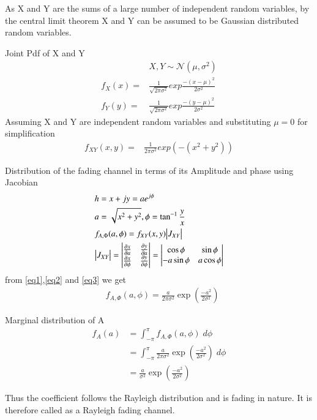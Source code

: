 \documentclass{beamer}
\begin{document}
\begin{frame}{}
 As X and Y are the sums of a large number
of independent random variables, by the central limit theorem X and Y can be
assumed to be Gaussian distributed random variables.
\begin{block}{Joint Pdf of X and Y}
\begin{align}
&X,Y\sim \mathcal{N}(\mu ,\sigma^2)\\
f_X(x)=&\frac{1}{\sqrt{2\pi \sigma^2}}exp{\frac{-(x-\mu)^2}{2\sigma^2}}\\
f_Y(y)=&\frac{1}{\sqrt{2\pi \sigma^2}}exp{\frac{-(y-\mu)^2}{2\sigma^2}}
\end{align}
Assuming X and Y are independent random variables and substituting $\mu=0$ for simplification 
\begin{align}
f_{XY}(x,y)=&\frac{1}{{2\pi \sigma^2 }}exp{\left(-(x^2+y^2)\right)}  \label{eq1} 
\end{align}
\end{block}
\end{frame}
\begin{frame}{}

\begin{block}{ Distribution of the fading channel in terms of its Amplitude and phase using Jacobian }
\begin{align}
&h=x+jy=ae^{j\phi}\\
&a=\sqrt{x^2+y^2}, \phi=\tan^{-1}{\frac{y}{x}}\label{eq2}\\
&f_{A,{\Phi}}(a,\phi)=f_{XY}(x,y)\big{|}J_{XY}\big{|}\\
&\big{|}J_{XY}\big{|} =
\begin{vmatrix}
\frac{\partial x}{\partial a} & \frac{\partial y}{\partial a} \\
\frac{\partial x}{\partial \phi} & \frac{\partial y}{\partial \phi} 
\end{vmatrix}=\begin{vmatrix}
\cos{\phi} & \sin{\phi} \\
-a\sin{\phi} & a\cos{\phi} 
\end{vmatrix}\label{eq3}
\end{align}
from \eqref{eq1},\eqref{eq2} and \eqref{eq3} we get
\begin{align}
  &f_{A,{\Phi}}(a,\phi)= \frac{a}{{2\pi \sigma^2}}\exp{\left(\frac{-a^2}{2\sigma^2}\right)} 
\end{align}
\end{block}
\end{frame}
\begin{frame}{}
 \begin{block}{Marginal distribution of A}
 \begin{align}
   f_A(a)&=\int_{-\pi}^{\pi}f_{A,{\Phi}}(a,\phi)\;d\phi\\
   &= \int_{-\pi}^{\pi}\frac{a}{{2\pi \sigma^2}}\exp{\left(\frac{-a^2}{2\sigma^2}\right)}\;d\phi\\
   &=\frac{a}{\sigma^2}\exp{\left(\frac{-a^2}{2\sigma^2}\right)}
 \end{align}
 \end{block}
 Thus the coefficient follows the Rayleigh distribution and is fading in nature. It is therefore called as a Rayleigh fading channel.
\end{frame}
\end{document}
